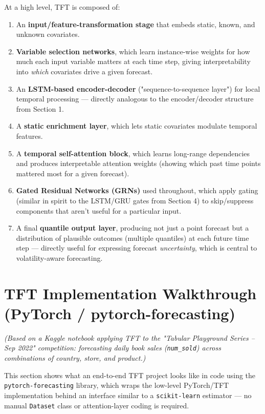 \documentclass[12pt,openany]{book}
\theoremstyle{definition}
\theoremstyle{remark}
\begin{document}
At a high level, TFT is composed of:
\begin{enumerate}
\item An \textbf{input/feature-transformation stage} that embeds static, known, and unknown covariates.
\item \textbf{Variable selection networks}, which learn instance-wise weights for how much each input variable matters at each time step, giving interpretability into \emph{which} covariates drive a given forecast.
\item An \textbf{LSTM-based encoder-decoder} ("sequence-to-sequence layer") for local temporal processing --- directly analogous to the encoder/decoder structure from Section 1.
\item A \textbf{static enrichment layer}, which lets static covariates modulate temporal features.
\item A \textbf{temporal self-attention block}, which learns long-range dependencies and produces interpretable attention weights (showing which past time points mattered most for a given forecast).
\item \textbf{Gated Residual Networks (GRNs)} used throughout, which apply gating (similar in spirit to the LSTM/GRU gates from Section 4) to skip/suppress components that aren't useful for a particular input.
\item A final \textbf{quantile output layer}, producing not just a point forecast but a distribution of plausible outcomes (multiple quantiles) at each future time step --- directly useful for expressing forecast \emph{uncertainty}, which is central to volatility-aware forecasting.

\end{enumerate}

\section{TFT Implementation Walkthrough (PyTorch / pytorch-forecasting)}

\emph{(Based on a Kaggle notebook applying TFT to the "Tabular Playground Series -- Sep 2022" competition: forecasting daily book sales (\texttt{num\_sold}) across combinations of country, store, and product.)}

This section shows what an end-to-end TFT project looks like in code using the \texttt{pytorch-forecasting} library, which wraps the low-level PyTorch/TFT implementation behind an interface similar to a \texttt{scikit-learn} estimator --- no manual \texttt{Dataset} class or attention-layer coding is required.
\end{document}
